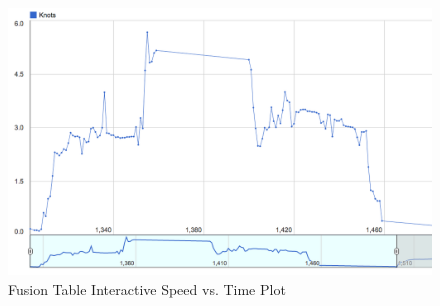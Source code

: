 \documentclass[heading.tex]{subfiles}
\begin{document}
\begin{figure}
\centering
\includegraphics[width=1\textwidth]{images/speedPlot.png}
 \caption{Fusion Table Interactive Speed vs. Time Plot}
\label{f:plot}
\end{figure}
\end{document}
